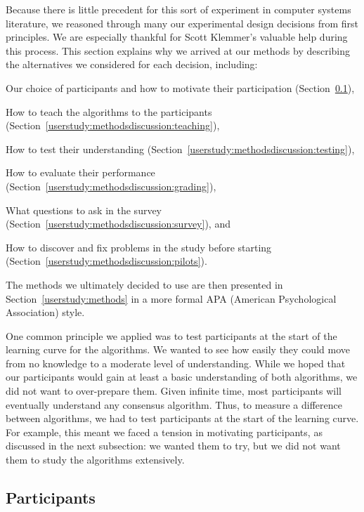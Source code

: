 Because there is little precedent for this sort of experiment in
computer systems literature, we reasoned through many our experimental
design decisions from first principles.
We are especially thankful for Scott Klemmer's valuable help during this
process.
This section explains why we arrived at our methods by
describing the alternatives we considered for each decision,
including:
\begin{compactitem}
\item Our
choice of participants and how to motivate their participation
(Section~\ref{userstudy:methodsdiscussion:participants}),
\item
How to teach the algorithms to the participants
(Section~\ref{userstudy:methodsdiscussion:teaching}),
\item
How to test their understanding
(Section~\ref{userstudy:methodsdiscussion:testing}),
\item
How to evaluate their performance
(Section~\ref{userstudy:methodsdiscussion:grading}),
\item
What questions to ask in the survey
(Section~\ref{userstudy:methodsdiscussion:survey}),
and
\item
How to discover and fix problems in the study before starting
(Section~\ref{userstudy:methodsdiscussion:pilots}).
\end{compactitem}
The methods we ultimately decided to use are then presented in
Section~\ref{userstudy:methods} in a more formal APA
(American Psychological Association) style.

One common principle we applied was to test participants at the start
of the learning curve for the algorithms. We wanted to see how easily
they could move from no knowledge to a moderate level of understanding.
While we hoped that our participants would gain at least a basic
understanding of both algorithms, we did not
want to over-prepare them. Given infinite time, most participants will
eventually understand any consensus algorithm. Thus, to measure a
difference between algorithms, we had to test participants at the
start of the learning curve. For example, this meant we faced a tension
in motivating participants, as discussed in the next subsection: we
wanted them to try, but we did not want them to study the algorithms
extensively.

\subsection{Participants}
\label{userstudy:methodsdiscussion:participants}

